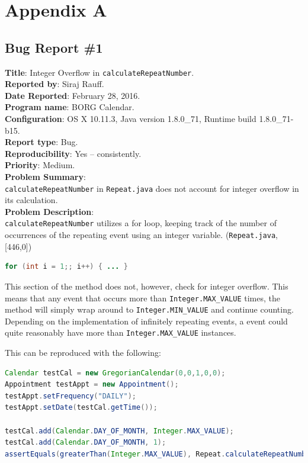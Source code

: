 \newpage

\section{Appendix A}\label{appendix-a}

\subsection{Bug Report \#1}\label{bug-report-1}

\textbf{Title}: Integer Overflow in \lstinline!calculateRepeatNumber!.\\
\textbf{Reported by}: Siraj Rauff.\\
\textbf{Date Reported}: February 28, 2016.\\
\textbf{Program name}: BORG Calendar.\\
\textbf{Configuration}: OS X 10.11.3, Java version 1.8.0\_71, Runtime
build 1.8.0\_71-b15.\\
\textbf{Report type}: Bug.\\
\textbf{Reproducibility}: Yes -- consistently.\\
\textbf{Priority}: Medium.\\
\textbf{Problem Summary}:\\
\lstinline!calculateRepeatNumber! in \lstinline!Repeat.java! does not
account for integer overflow in its calculation.\\
\textbf{Problem Description}:\\
\lstinline!calculateRepeatNumber! utilizes a for loop, keeping track of
the number of occurrences of the repeating event using an integer
variable. (\lstinline!Repeat.java!, {[}446,0{]})

\begin{lstlisting}[language=Java]
for (int i = 1;; i++) { ... }
\end{lstlisting}

This section of the method does not, however, check for integer
overflow. This means that any event that occurs more than
\lstinline!Integer.MAX_VALUE! times, the method will simply wrap around
to \lstinline!Integer.MIN_VALUE! and continue counting. Depending on the
implementation of infinitely repeating events, a event could quite
reasonably have more than \lstinline!Integer.MAX_VALUE! instances.

This can be reproduced with the following:

\begin{lstlisting}[language=Java]
Calendar testCal = new GregorianCalendar(0,0,1,0,0);
Appointment testAppt = new Appointment();
testAppt.setFrequency("DAILY");
testAppt.setDate(testCal.getTime());

testCal.add(Calendar.DAY_OF_MONTH, Integer.MAX_VALUE);
testCal.add(Calendar.DAY_OF_MONTH, 1);
assertEquals(greaterThan(Integer.MAX_VALUE), Repeat.calculateRepeatNumber(testCal, testAppt));
\end{lstlisting}

